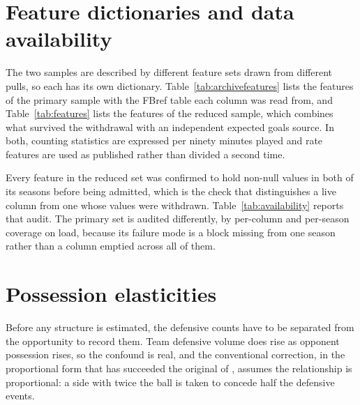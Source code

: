 \section{Feature dictionaries and data availability}
\label{sec:si:features}

The two samples are described by different feature sets drawn from different pulls, so each has
its own dictionary. Table~\ref{tab:archivefeatures} lists the \ArcFeatures{} features of the
primary sample with the FBref table each column was read from, and Table~\ref{tab:features}
lists the \NFeatures{} features of the reduced sample, which combines what survived the
withdrawal with an independent expected goals source. In both, counting statistics are
expressed per ninety minutes played and rate features are used as published rather than divided
a second time.

Every feature in the reduced set was confirmed to hold non-null values in both of its seasons
before being admitted, which is the check that distinguishes a live column from one whose values
were withdrawn. Table~\ref{tab:availability} reports that audit. The primary set is audited
differently, by per-column and per-season coverage on load, because its failure mode is a block
missing from one season rather than a column emptied across all of them.







\section{Possession elasticities}
\label{sec:si:elasticity}

Before any structure is estimated, the defensive counts have to be separated from the
opportunity to record them. Team defensive volume does rise as opponent possession rises, so the
confound is real, and the conventional correction, in the proportional form that has succeeded
the original of \citet{knutson2014possession}, assumes the relationship is proportional: a side
with twice the ball is taken to concede half the defensive events.

